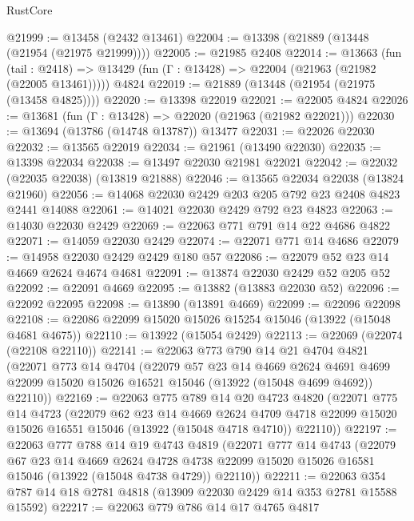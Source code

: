 \begin{lexlean}{RustCore}
\begin{coremodule}
@21999 := @13458 (@2432 @13461)
@22004 := @13398 (@21889 (@13448 (@21954 (@21975 @21999))))
@22005 := @21985 @2408
@22014 := @13663
    (fun (tail : @2418) => @13429 (fun (Γ : @13428) => @22004 (@21963 (@21982 (@22005 @13461)))))
    @4824
@22019 := @21889 (@13448 (@21954 (@21975 (@13458 @4825))))
@22020 := @13398 @22019
@22021 := @22005 @4824
@22026 := @13681 (fun (Γ : @13428) => @22020 (@21963 (@21982 @22021)))
@22030 := @13694 (@13786 (@14748 @13787)) @13477
@22031 := @22026 @22030
@22032 := @13565 @22019
@22034 := @21961 (@13490 @22030)
@22035 := @13398 @22034
@22038 := @13497 @22030 @21981 @22021
@22042 := @22032 (@22035 @22038) (@13819 @21888)
@22046 := @13565 @22034 @22038 (@13824 @21960)
@22056 := @14068 @22030 @2429 @203 @205 @792 @23 @2408 @4823 @2441 @14088
@22061 := @14021 @22030 @2429 @792 @23 @4823
@22063 := @14030 @22030 @2429
@22069 := @22063 @771 @791 @14 @22 @4686 @4822
@22071 := @14059 @22030 @2429
@22074 := @22071 @771 @14 @4686
@22079 := @14958 @22030 @2429 @2429 @180 @57
@22086 := @22079 @52 @23 @14 @4669 @2624 @4674 @4681
@22091 := @13874 @22030 @2429 @52 @205 @52
@22092 := @22091 @4669
@22095 := @13882 (@13883 @22030 @52)
@22096 := @22092 @22095
@22098 := @13890 (@13891 @4669)
@22099 := @22096 @22098
@22108 := @22086 @22099 @15020 @15026 @15254 @15046 (@13922 (@15048 @4681 @4675))
@22110 := @13922 (@15054 @2429)
@22113 := @22069 (@22074 (@22108 @22110))
@22141 := @22063
    @773
    @790
    @14
    @21
    @4704
    @4821
    (@22071
      @773
      @14
      @4704
      (@22079
        @57
        @23
        @14
        @4669
        @2624
        @4691
        @4699
        @22099
        @15020
        @15026
        @16521
        @15046
        (@13922 (@15048 @4699 @4692))
        @22110))
@22169 := @22063
    @775
    @789
    @14
    @20
    @4723
    @4820
    (@22071
      @775
      @14
      @4723
      (@22079
        @62
        @23
        @14
        @4669
        @2624
        @4709
        @4718
        @22099
        @15020
        @15026
        @16551
        @15046
        (@13922 (@15048 @4718 @4710))
        @22110))
@22197 := @22063
    @777
    @788
    @14
    @19
    @4743
    @4819
    (@22071
      @777
      @14
      @4743
      (@22079
        @67
        @23
        @14
        @4669
        @2624
        @4728
        @4738
        @22099
        @15020
        @15026
        @16581
        @15046
        (@13922 (@15048 @4738 @4729))
        @22110))
@22211 := @22063 @354 @787 @14 @18 @2781 @4818 (@13909 @22030 @2429 @14 @353 @2781 @15588 @15592)
@22217 := @22063 @779 @786 @14 @17 @4765 @4817

\end{coremodule}
\end{lexlean}
